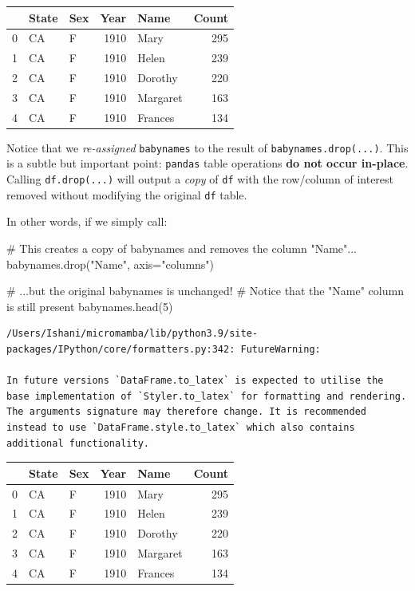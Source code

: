\documentclass[
  letterpaper,
  DIV=11,
  numbers=noendperiod]{scrreprt}
\newenvironment{Shaded}{\begin{snugshade}}{\end{snugshade}}
\newcommand{\CommentTok}[1]{\textcolor[rgb]{0.37,0.37,0.37}{#1}}
\newcommand{\DecValTok}[1]{\textcolor[rgb]{0.68,0.00,0.00}{#1}}
\newcommand{\NormalTok}[1]{\textcolor[rgb]{0.00,0.23,0.31}{#1}}
\newcommand{\OperatorTok}[1]{\textcolor[rgb]{0.37,0.37,0.37}{#1}}
\newcommand{\StringTok}[1]{\textcolor[rgb]{0.13,0.47,0.30}{#1}}
\begin{document}
\begin{tabular}{lllrlr}
\toprule
{} & State & Sex &  Year &      Name &  Count \\
\midrule
0 &    CA &   F &  1910 &      Mary &    295 \\
1 &    CA &   F &  1910 &     Helen &    239 \\
2 &    CA &   F &  1910 &   Dorothy &    220 \\
3 &    CA &   F &  1910 &  Margaret &    163 \\
4 &    CA &   F &  1910 &   Frances &    134 \\
\bottomrule
\end{tabular}

Notice that we \emph{re-assigned} \texttt{babynames} to the result of
\texttt{babynames.drop(...)}. This is a subtle but important point:
\texttt{pandas} table operations \textbf{do not occur in-place}. Calling
\texttt{df.drop(...)} will output a \emph{copy} of \texttt{df} with the
row/column of interest removed without modifying the original
\texttt{df} table.

In other words, if we simply call:

\begin{Shaded}
\begin{Highlighting}[]
\CommentTok{\# This creates a copy of \textasciigrave{}babynames\textasciigrave{} and removes the column "Name"...}
\NormalTok{babynames.drop(}\StringTok{"Name"}\NormalTok{, axis}\OperatorTok{=}\StringTok{"columns"}\NormalTok{)}

\CommentTok{\# ...but the original \textasciigrave{}babynames\textasciigrave{} is unchanged! }
\CommentTok{\# Notice that the "Name" column is still present}
\NormalTok{babynames.head(}\DecValTok{5}\NormalTok{)}
\end{Highlighting}
\end{Shaded}

\begin{verbatim}
/Users/Ishani/micromamba/lib/python3.9/site-packages/IPython/core/formatters.py:342: FutureWarning:

In future versions `DataFrame.to_latex` is expected to utilise the base implementation of `Styler.to_latex` for formatting and rendering. The arguments signature may therefore change. It is recommended instead to use `DataFrame.style.to_latex` which also contains additional functionality.
\end{verbatim}

\begin{tabular}{lllrlr}
\toprule
{} & State & Sex &  Year &      Name &  Count \\
\midrule
0 &    CA &   F &  1910 &      Mary &    295 \\
1 &    CA &   F &  1910 &     Helen &    239 \\
2 &    CA &   F &  1910 &   Dorothy &    220 \\
3 &    CA &   F &  1910 &  Margaret &    163 \\
4 &    CA &   F &  1910 &   Frances &    134 \\
\bottomrule
\end{tabular}
\end{document}
